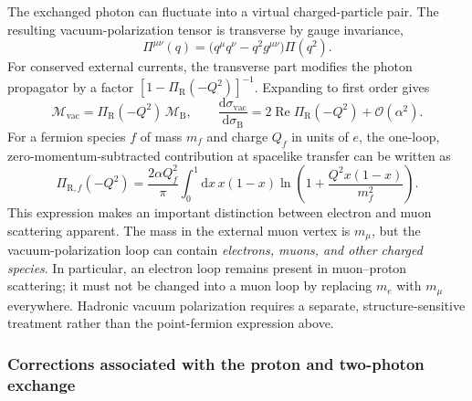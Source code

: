 The exchanged photon can fluctuate into a virtual charged-particle pair.
The resulting vacuum-polarization tensor is transverse by gauge invariance,
\begin{equation}
 \Pi^{\mu\nu}(q)
   =\bigl(q^\mu q^\nu-q^2g^{\mu\nu}\bigr)\Pi(q^2).
\end{equation}
For conserved external currents, the transverse part modifies the photon
propagator by a factor $[1-\Pi_{\mathrm R}(-Q^2)]^{-1}$. Expanding to first
order gives
\begin{equation}
 \mathcal M_{\mathrm{vac}}
   =\Pi_{\mathrm R}(-Q^2)\,\mathcal M_{\mathrm B},
 \qquad
 \frac{\mathrm d\sigma_{\mathrm{vac}}}{\mathrm d\sigma_{\mathrm B}}
   =2\operatorname{Re}\Pi_{\mathrm R}(-Q^2)
   +\mathcal O(\alpha^2).
 \label{eq:nlo_vac_factor}
\end{equation}
For a fermion species $f$ of mass $m_f$ and charge $Q_f$ in units of $e$,
the one-loop, zero-momentum-subtracted contribution at spacelike transfer can
be written as
\begin{equation}
 \Pi_{{\mathrm R},f}(-Q^2)
  =\frac{2\alpha Q_f^2}{\pi}\int_0^1\!\mathrm dx\,x(1-x)
     \ln\!\left(1+\frac{Q^2x(1-x)}{m_f^2}\right).
 \label{eq:nlo_vac_integral}
\end{equation}
This expression makes an important distinction between electron and muon
scattering apparent. The mass in the external muon vertex is $m_\mu$, but
the vacuum-polarization loop can contain \emph{electrons, muons, and other
charged species}. In particular, an electron loop remains present in
muon--proton scattering; it must not be changed into a muon loop by replacing
$m_e$ with $m_\mu$ everywhere. Hadronic vacuum polarization requires a
separate, structure-sensitive treatment rather than the point-fermion
expression above.

\subsubsection{Corrections associated with the proton and two-photon exchange}

